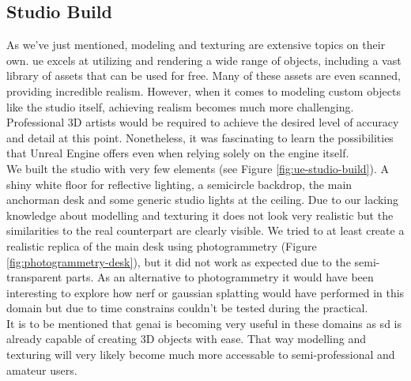 \documentclass[
  a4paper,  %
  twoside,  %
  bibliography=totoc,
  headsepline,
  cleardoublepage=empty,
  parskip=half,
  draft=false
]{scrbook}
\begin{document}
\subsection*{Studio Build}
As we've just mentioned, modeling and texturing are extensive topics on their own. \gls{ue} excels at utilizing and rendering a wide range of objects, including a vast library of assets that can be used for free. Many of these assets are even scanned, providing incredible realism. However, when it comes to modeling custom objects like the studio itself, achieving realism becomes much more challenging. Professional 3D artists would be required to achieve the desired level of accuracy and detail at this point. Nonetheless, it was fascinating to learn the possibilities that Unreal Engine offers even when relying solely on the engine itself. \\
We built the studio with very few elements (see Figure \ref{fig:ue-studio-build}). A shiny white floor for reflective lighting, a semicircle backdrop, the main anchorman desk and some generic studio lights at the ceiling. Due to our lacking knowledge about modelling and texturing it does not look very realistic but the similarities to the real counterpart are clearly visible. We tried to at least create a realistic replica of the main desk using photogrammetry (Figure \ref{fig:photogrammetry-desk}), but it did not work as expected due to the semi-transparent parts. As an alternative to photogrammetry it would have been interesting to explore how \gls{nerf} or gaussian splatting would have performed in this domain but due to time constrains couldn't be tested during the practical. \\ 
It is to be mentioned that \gls{genai} is becoming very useful in these domains as \gls{sd} is already capable of creating 3D objects with ease. That way modelling and texturing will very likely become much more accessable to semi-professional and amateur users.
\end{document}
